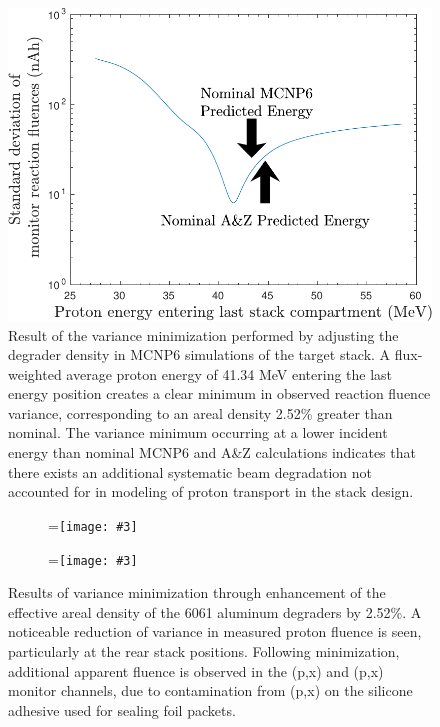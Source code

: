 \documentclass[3p]{elsarticle}
\newcommand{\subfigimg}[4][,]{%
  \setbox1=\hbox{\texttt{[image: \#3]}}%
  \leavevmode\rlap{\usebox1}%
  \rlap{\hspace*{#4pt}\raisebox{\dimexpr\ht1-2\baselineskip}{#2}}%
  \phantom{\usebox1}%
}
\begin{document}
\begin{figure}
 \centering
 \includegraphics[width=0.5\linewidth]{./figures/variation_curve-crop.pdf}

 \caption{Result of the variance minimization performed by adjusting the degrader density in MCNP6 simulations of the target stack.  A flux-weighted average proton energy of 41.34 MeV entering the last energy position creates a clear minimum in observed reaction fluence variance, corresponding to an areal density 2.52\% greater than nominal. The variance minimum occurring at a lower incident energy than nominal MCNP6 and A\&Z calculations indicates that there exists an additional systematic beam degradation not accounted for in modeling of proton transport in the stack design.}
 \label{fig:variation_curve}
\end{figure}


\begin{figure}
    \centering
    \begin{subfigure}[t]{0.50\textwidth}
        \centering
        \subfigimg[width=\linewidth]{a)}{./figures/before_minimization_plot.pdf}{50}
         \label{fig:before_minimization}
    \end{subfigure}%
     \begin{subfigure}[t]{0.50\textwidth}
        \centering
        \subfigimg[width=\linewidth]{b)}{./figures/after_minimization_plot.pdf}{50}
         \label{fig:after_minimization}
    \end{subfigure}%
    \caption{Results of variance minimization through enhancement of the effective areal density of the 6061 aluminum degraders by 2.52\%. A noticeable reduction of variance in measured proton fluence is seen,  particularly at the  rear stack positions. Following minimization, additional apparent fluence is observed in the  (p,x) and (p,x) monitor channels, due to contamination from (p,x) on the silicone adhesive used for sealing foil packets.}
     \label{fig:variance_mins}
\end{figure}
\end{document}
